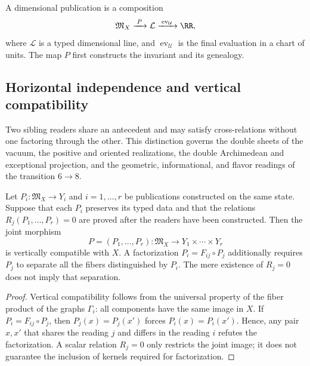 \begin{definition}
A dimensional publication is a composition
\begin{equation}
 \mathfrak M_X\xrightarrow{\;P\;}\mathcal L
 \xrightarrow{\;\operatorname{ev}_{\mathcal U}\;}\RR,
 \label{rm:eq:dimensional-publication}
\end{equation}
where \(\mathcal L\) is a typed dimensional line, and
\(\operatorname{ev}_{\mathcal U}\) is the final evaluation in a chart of
units. The map \(P\) first constructs the invariant and its genealogy.
\end{definition}

\subsection{Horizontal independence and vertical compatibility}

Two sibling readers share an antecedent and may satisfy cross-relations
without one factoring through the other. This distinction governs the
double sheets of the vacuum, the positive and oriented realizations, the double
Archimedean and exceptional projection, and the geometric,
informational, and flavor readings of the transition \(6\to8\).

\begin{theorem}
Let \(P_i:\mathfrak M_X\to Y_i\) and \(i=1,\ldots,r\) be publications
constructed on the same state. Suppose that each \(P_i\) preserves its
typed data and that the relations \(R_j(P_1,\ldots,P_r)=0\) are proved
after the readers have been constructed. Then the joint morphism
\begin{equation}
 P=(P_1,\ldots,P_r):\mathfrak M_X\longrightarrow
 Y_1\times\cdots\times Y_r
 \label{rm:eq:joint-publication}
\end{equation}
is vertically compatible with \(X\). A factorization
\(P_i=F_{ij}\circ P_j\) additionally requires \(P_j\) to separate all the
fibers distinguished by \(P_i\). The mere existence of \(R_j=0\) does not imply
that separation.
\end{theorem}

\begin{proof}
Vertical compatibility follows from the universal property of the
fiber product of the graphs \(\Gamma_i\): all components have
the same image in \(X\).
If \(P_i=F_{ij}\circ P_j\), then
\(P_j(x)=P_j(x')\) forces \(P_i(x)=P_i(x')\). Hence, any pair
\(x,x'\) that shares the reading \(j\) and differs in the reading \(i\) refutes
the factorization. A scalar relation \(R_j=0\) only restricts the joint
image; it does not guarantee the inclusion of kernels required for factorization.
\end{proof}

